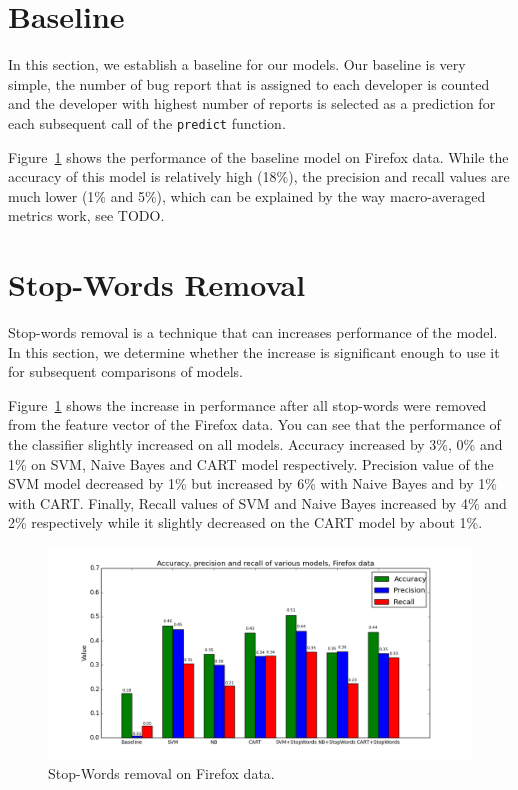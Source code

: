 \section{Baseline}

In this section, we establish a baseline for our models. Our baseline is very simple, the number of bug report that is assigned to each developer is counted and the developer with highest number of reports is selected as a prediction for each subsequent call of the \texttt{predict} function.

Figure~\ref{fig:models.firefox.stopwords} shows the performance of the baseline model on Firefox data. While the accuracy of this model is relatively high (18\%), the precision and recall values are much lower (1\% and 5\%), which can be explained by the way macro-averaged metrics work, see TODO. 

\section{Stop-Words Removal}

Stop-words removal is a technique that can increases performance of the model. In this section, we determine whether the increase is significant enough to use it for subsequent comparisons of models.

Figure~\ref{fig:models.firefox.stopwords} shows the increase in performance after all stop-words were removed from the feature vector of the Firefox data. You can see that the performance of the classifier slightly increased on all models. Accuracy increased by 3\%, 0\% and 1\% on SVM, Naive Bayes and CART model respectively. Precision value of the SVM model decreased by 1\% but increased by 6\% with Naive Bayes and by 1\% with CART. Finally, Recall values of SVM and Naive Bayes increased by 4\% and 2\% respectively while it slightly decreased on the CART model by about 1\%.

\begin{figure}[htbp]
    \centering
        \includegraphics[width=\textwidth]{./images/comparison_of_models/firefox_0.png}
    \caption{Stop-Words removal on Firefox data.}
    \label{fig:models.firefox.stopwords}
\end{figure}

